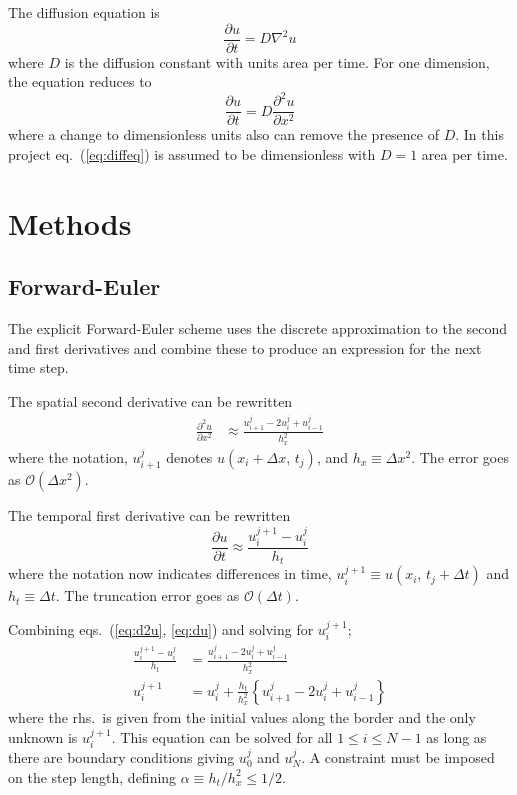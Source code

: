 \documentclass[a4paper,11pt]{article}
\begin{document}
The diffusion equation is
\begin{equation}
    \frac{\partial u}{\partial t} = D \nabla^2 u
    \label{eq:diff-general}
\end{equation}
where $D$ is the diffusion constant with units area per time. For one dimension, the equation reduces to
\begin{equation}
    \frac{\partial u}{\partial t} = D \frac{\partial^2 u}{\partial x^2}
    \label{eq:diffeq}
\end{equation}
where a change to dimensionless units also can remove the presence of $D$. In this project eq.~(\ref{eq:diffeq}) is assumed to be dimensionless with $D=1$ area per time.


\section{Methods}
\subsection{Forward-Euler}
The explicit Forward-Euler scheme uses the discrete approximation to the second and first derivatives and combine these to produce an expression for the next time step.

The spatial second derivative can be rewritten
\begin{align}
    \frac{\partial^2 u}{\partial x^2} &\approx \frac{u^j_{i+1} - 2 u^j_{i} + u^j_{i-1}}{h_x^2}
    \label{eq:d2u}
\end{align}
where the notation, $u^j_{i+1}$ denotes $u(x_i + \Delta x, \, t_j)$, and $h_x \equiv \Delta x^2$. The error goes as $\mathcal{O}(\Delta x^2)$.

The temporal first derivative can be rewritten 
\begin{equation}
    \frac{\partial u}{\partial t} \approx \frac{u^{j+1}_i - u^{j}_i}{h_t}
    \label{eq:du}
\end{equation}
where the notation now indicates differences in time, $u^{j+1}_i \equiv u\left( x_i, \, t_j + \Delta t \right)$ and $h_t \equiv \Delta t$. The truncation error goes as $\mathcal{O}(\Delta t)$.

Combining eqs.~(\ref{eq:d2u}, \ref{eq:du}) and solving for $u^{j+1}_i$;
\begin{align*}
    \frac{u^{j+1}_i - u^{j}_i}{h_t} &= \frac{u^j_{i+1} - 2 u^j_{i} + u^j_{i-1}}{h_x^2} \\
    u^{j+1}_i &= u^j_i + \frac{h_t}{h_x^2} \left\{  u^j_{i+1} - 2 u^j_{i} + u^j_{i-1} \right\} 
\end{align*}
where the rhs.~is given from the initial values along the border and the only unknown is $u^{j+1}_i$. This equation can be solved for all $ 1 \leq i \leq N-1$ as long as there are boundary conditions giving $u_0^j$ and $u_N^j$. A constraint must be imposed on the step length, defining $\alpha \equiv h_t/h_x^2 \leq 1/2$.
\end{document}
